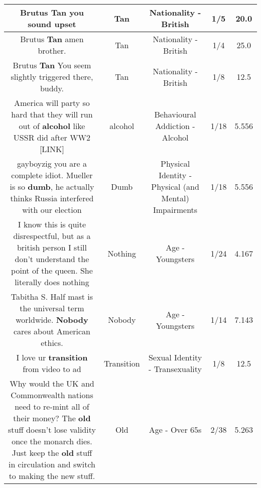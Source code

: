 \documentclass[11pt]{article}
\newlength\mylength
\begin{document}
\begin{center}
\begin{longtable}{|C{.65\mylength}|C{.30\mylength}|C{.12\mylength}|C{.12\mylength}|C{.12\mylength}|}
  \small Brutus \textbf{Tan} you sound upset\normalsize   & Tan & Nationality - British & 1/5 & 20.0 \\  \hline
  \small Brutus \textbf{Tan} amen brother.\normalsize   & Tan & Nationality - British & 1/4 & 25.0 \\  \hline
  \small Brutus \textbf{Tan} You seem slightly triggered there, buddy.\normalsize   & Tan & Nationality - British & 1/8 & 12.5 \\  \hline
  \small America will party so hard that they will run out of \textbf{alcohol} like USSR did after WW2 [LINK] \normalsize   & alcohol & Behavioural Addiction - Alcohol & 1/18 & 5.556 \\  \hline
  \small gayboyzig you are a complete idiot. Mueller is so \textbf{dumb}, he actually thinks Russia interfered with our election\normalsize   & Dumb & Physical Identity - Physical (and Mental) Impairments & 1/18 & 5.556 \\  \hline
  \small I know this is quite disrespectful, but as a british person I still don't understand the point of the queen. She literally does nothing\normalsize   & Nothing & Age - Youngsters & 1/24 & 4.167 \\  \hline
  \small Tabitha S. Half mast is the universal term worldwide. \textbf{Nobody} cares about American ethics.\normalsize   & Nobody & Age - Youngsters & 1/14 & 7.143 \\  \hline
  \small I love ur \textbf{transition} from video to ad\normalsize   & Transition & Sexual Identity - Transexuality & 1/8 & 12.5 \\  \hline
  \small Why would the UK and Commonwealth nations need to re-mint all of their money? The \textbf{old} stuff doesn't lose validity once the monarch dies. Just keep the \textbf{old} stuff in circulation and switch to making the new stuff.\normalsize   & Old & Age - Over 65s & 2/38 & 5.263 \\  \hline

\end{longtable}
\end{center}
\end{document}
